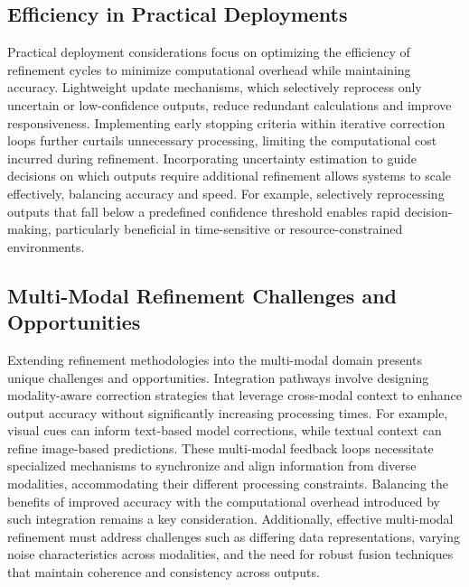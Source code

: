 \documentclass[sigconf]{acmart}
\begin{document}
\subsection{Efficiency in Practical Deployments}
Practical deployment considerations focus on optimizing the efficiency of refinement cycles to minimize computational overhead while maintaining accuracy. Lightweight update mechanisms, which selectively reprocess only uncertain or low-confidence outputs, reduce redundant calculations and improve responsiveness. Implementing early stopping criteria within iterative correction loops further curtails unnecessary processing, limiting the computational cost incurred during refinement. Incorporating uncertainty estimation to guide decisions on which outputs require additional refinement allows systems to scale effectively, balancing accuracy and speed. For example, selectively reprocessing outputs that fall below a predefined confidence threshold enables rapid decision-making, particularly beneficial in time-sensitive or resource-constrained environments.

\subsection{Multi-Modal Refinement Challenges and Opportunities}
Extending refinement methodologies into the multi-modal domain presents unique challenges and opportunities. Integration pathways involve designing modality-aware correction strategies that leverage cross-modal context to enhance output accuracy without significantly increasing processing times. For example, visual cues can inform text-based model corrections, while textual context can refine image-based predictions. These multi-modal feedback loops necessitate specialized mechanisms to synchronize and align information from diverse modalities, accommodating their different processing constraints. Balancing the benefits of improved accuracy with the computational overhead introduced by such integration remains a key consideration. Additionally, effective multi-modal refinement must address challenges such as differing data representations, varying noise characteristics across modalities, and the need for robust fusion techniques that maintain coherence and consistency across outputs.
\end{document}
